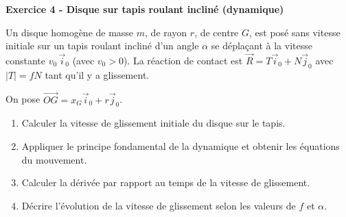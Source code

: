 \documentclass[12pt,a4paper]{article}
\begin{document}
\begin{boiteexercice}
\textbf{Exercice 4 - Disque sur tapis roulant incliné (dynamique)}\niveau{\difficile}

Un disque homogène de masse $m$, de rayon $r$, de centre $G$, est posé sans vitesse initiale sur un tapis roulant incliné d'un angle $\alpha$ se déplaçant à la vitesse constante $v_0\,\vec{i}_0$ (avec $v_0 > 0$). La réaction de contact est $\vec{R} = T\vec{i}_0 + N\vec{j}_0$ avec $|T| = fN$ tant qu'il y a glissement.

On pose $\overrightarrow{OG} = x_G\vec{i}_0 + r\vec{j}_0$.

\begin{enumerate}
  \item Calculer la vitesse de glissement initiale du disque sur le tapis.
  \item Appliquer le principe fondamental de la dynamique et obtenir les équations du mouvement.
  \item Calculer la dérivée par rapport au temps de la vitesse de glissement.
  \item Décrire l'évolution de la vitesse de glissement selon les valeurs de $f$ et $\alpha$.
\end{enumerate}
\end{boiteexercice}
\end{document}
